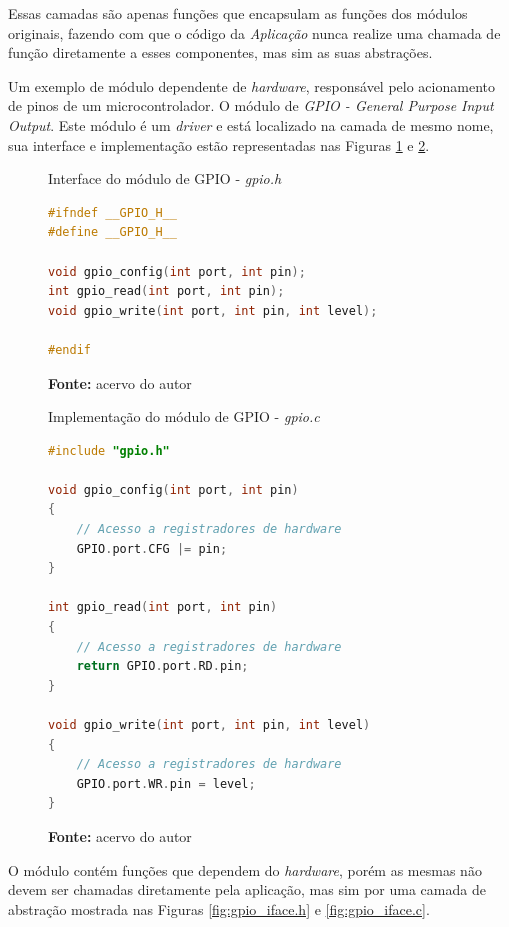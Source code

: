 \documentclass[times, twoside, watermark]{artigo}
\begin{document}
Essas camadas são apenas funções que encapsulam as funções dos módulos originais,
fazendo com que o código da \textit{Aplicação} nunca realize uma chamada de função
diretamente a esses componentes, mas sim as suas abstrações.

Um exemplo de módulo dependente de \textit{hardware},
responsável pelo acionamento de pinos de um microcontrolador. O módulo de
\textit{GPIO - General Purpose Input Output}. Este módulo é um \textit{driver} e está
localizado na camada de mesmo nome, sua interface e implementação estão representadas
nas Figuras \ref{fig:gpio.h} e \ref{fig:gpio.c}.\hfill\\

\begin{figure}[H]
  \centering
  \caption{Interface do módulo de GPIO - \textit{gpio.h}}
\begin{lstlisting}[language=C]
#ifndef __GPIO_H__
#define __GPIO_H__

void gpio_config(int port, int pin);
int gpio_read(int port, int pin);
void gpio_write(int port, int pin, int level);

#endif
\end{lstlisting}
  \label{fig:gpio.h}
  \caption*{\newline\textbf{Fonte:} acervo do autor}
\end{figure}


\begin{figure}[H]
  \centering
  \caption{Implementação do módulo de GPIO - \textit{gpio.c}}
\begin{lstlisting}[language=C]
#include "gpio.h"

void gpio_config(int port, int pin)
{
    // Acesso a registradores de hardware
    GPIO.port.CFG |= pin;
}

int gpio_read(int port, int pin)
{
    // Acesso a registradores de hardware
    return GPIO.port.RD.pin;
}

void gpio_write(int port, int pin, int level)
{
    // Acesso a registradores de hardware
    GPIO.port.WR.pin = level;
}
\end{lstlisting}
  \label{fig:gpio.c}
  \caption*{\newline\textbf{Fonte:} acervo do autor}
\end{figure}

O módulo contém funções que dependem do \textit{hardware}, porém as mesmas não
devem ser chamadas diretamente pela aplicação, mas sim por uma camada de abstração
mostrada nas Figuras \ref{fig:gpio_iface.h} e \ref{fig:gpio_iface.c}.\hfill\\
\end{document}
